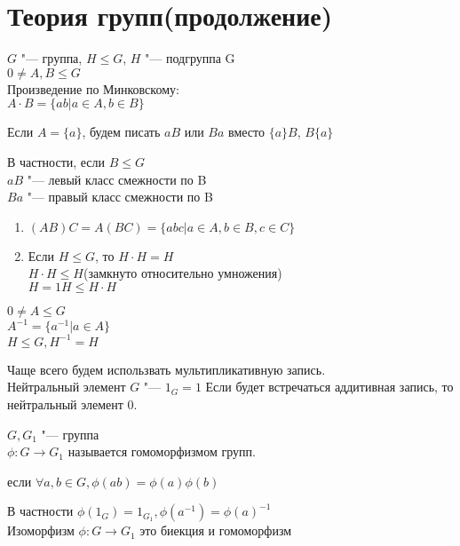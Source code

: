 ﻿\chapter{Теория групп(продолжение)}
\begin{Rem}
$G$ "--- группа, $H \le G$, $H$ "--- подгруппа G\\

$0 \ne A, B \le G$\\
Произведение по Минковскому:\\
$A \cdot B = \{ab| a \in A, b \in B\}$

Если $A = \{a\}$, будем писать $aB$ или $Ba$ вместо $\{a\}B$, $B\{a\}$

В частности, если $B \le G$\\
    $aB$ "--- левый класс смежности по B\\
    $Ba$ "--- правый класс смежности по B\\
\end{Rem}

\begin{conseq}
\begin{enumerate}
\item$(AB)C = A(BC) = \{abc|a \in A, b \in B, c \in C\}$\\
\item
Если $H \le G$, то $H \cdot H = H$\\
   $H \cdot H \le H$(замкнуто относительно умножения)\\
   $H = 1 H \le H \cdot H$\\
\end{enumerate}
\end{conseq}
\begin{Def}
$0 \ne A \le G$\\
$A^{-1} = \{a^{-1}|a \in A\}$\\
$H \le G, H^{-1} = H$\\
\end{Def}
\begin{Rem}
Чаще всего будем использвать мультипликативную запись.\\
Нейтральный элемент $G$ "--- $1_{G} = 1$
Если будет  встречаться аддитивная запись, то нейтральный элемент $0$.
\end{Rem}

\begin{Def}
$G, G_1$ "--- группа\\
$\phi \colon G \to G_1$ называется гомоморфизмом групп. 

если $\forall a, b \in G, \phi(ab) = \phi(a) \phi(b)$

В частности $\phi(1_G) = 1_{G_1}, \phi(a^{-1}) = \phi(a)^{-1}$\\

Изоморфизм $\phi \colon G \to G_1$ это биекция и гомоморфизм \\
\end{Def}
    

